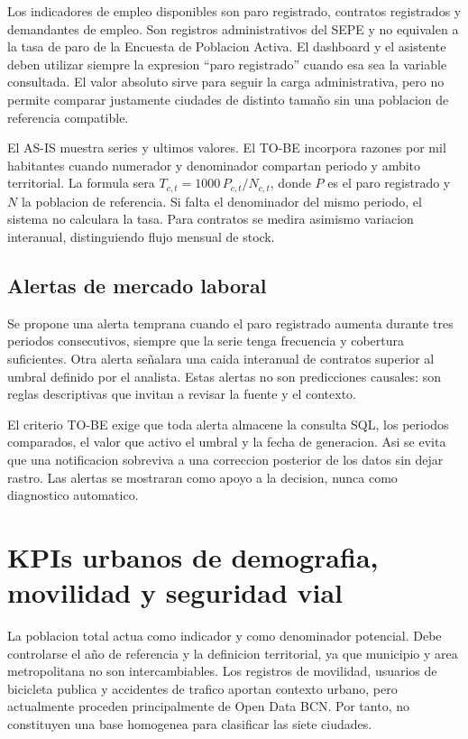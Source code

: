 Los indicadores de empleo disponibles son paro registrado, contratos registrados y demandantes de empleo. Son registros administrativos del SEPE y no equivalen a la tasa de paro de la Encuesta de Poblacion Activa. El dashboard y el asistente deben utilizar siempre la expresion ``paro registrado'' cuando esa sea la variable consultada. El valor absoluto sirve para seguir la carga administrativa, pero no permite comparar justamente ciudades de distinto tamaño sin una poblacion de referencia compatible.

El AS-IS muestra series y ultimos valores. El TO-BE incorpora razones por mil habitantes cuando numerador y denominador compartan periodo y ambito territorial. La formula sera $T_{c,t}=1000\,P_{c,t}/N_{c,t}$, donde $P$ es el paro registrado y $N$ la poblacion de referencia. Si falta el denominador del mismo periodo, el sistema no calculara la tasa. Para contratos se medira asimismo variacion interanual, distinguiendo flujo mensual de stock.

\subsection{Alertas de mercado laboral}

Se propone una alerta temprana cuando el paro registrado aumenta durante tres periodos consecutivos, siempre que la serie tenga frecuencia y cobertura suficientes. Otra alerta señalara una caida interanual de contratos superior al umbral definido por el analista. Estas alertas no son predicciones causales: son reglas descriptivas que invitan a revisar la fuente y el contexto.

El criterio TO-BE exige que toda alerta almacene la consulta SQL, los periodos comparados, el valor que activo el umbral y la fecha de generacion. Asi se evita que una notificacion sobreviva a una correccion posterior de los datos sin dejar rastro. Las alertas se mostraran como apoyo a la decision, nunca como diagnostico automatico.

\section{KPIs urbanos de demografia, movilidad y seguridad vial}

La poblacion total actua como indicador y como denominador potencial. Debe controlarse el año de referencia y la definicion territorial, ya que municipio y area metropolitana no son intercambiables. Los registros de movilidad, usuarios de bicicleta publica y accidentes de trafico aportan contexto urbano, pero actualmente proceden principalmente de Open Data BCN. Por tanto, no constituyen una base homogenea para clasificar las siete ciudades.

